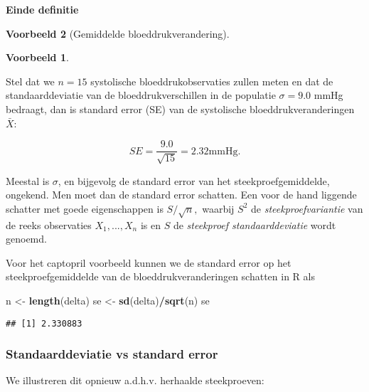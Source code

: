 \documentclass[
  12pt,dutch,coursenotes]{book}
\newenvironment{Shaded}{\begin{snugshade}}{\end{snugshade}}
\newcommand{\KeywordTok}[1]{\textcolor[rgb]{0.13,0.29,0.53}{\textbf{#1}}}
\newcommand{\NormalTok}[1]{#1}
\newcommand{\OperatorTok}[1]{\textcolor[rgb]{0.81,0.36,0.00}{\textbf{#1}}}
\newcommand{\StringTok}[1]{\textcolor[rgb]{0.31,0.60,0.02}{#1}}
\theoremstyle{definition}
\theoremstyle{definition}
\newtheorem{example}{Voorbeeld}[chapter]
\theoremstyle{definition}
\theoremstyle{remark}
\begin{document}
\textbf{Einde definitie}

\begin{example}[Gemiddelde bloeddrukverandering]
\begin{example}

\protect\hypertarget{exm:unnamed-chunk-131}{}{\label{exm:unnamed-chunk-131} \iffalse (Gemiddelde bloeddrukverandering) \fi{} }

\end{example}
\end{example}

Stel dat we \(n = 15\) systolische bloeddrukobservaties zullen meten en dat de standaarddeviatie van de bloeddrukverschillen in de populatie \(\sigma = 9.0\) mmHg bedraagt, dan is standard error (SE) van de systolische bloeddrukveranderingen \(\bar X\):

\[
SE= \frac{9.0}{\sqrt{15}}=2.32\text{mmHg.}
\]

Meestal is \(\sigma\), en bijgevolg de standard error van het
steekproefgemiddelde, ongekend. Men moet dan de standard error schatten.
Een voor de hand liggende schatter met goede eigenschappen is \(S/\sqrt{n},\)
waarbij \(S^2\) de \emph{steekproefvariantie} van de reeks observaties \(X_1,...,X_n\) is en \(S\) de \emph{steekproef standaarddeviatie} wordt genoemd.

Voor het captopril voorbeeld kunnen we de standard error op het steekproefgemiddelde van de bloeddrukveranderingen schatten in R als

\begin{Shaded}
\begin{Highlighting}[]
\NormalTok{n \textless{}{-}}\StringTok{ }\KeywordTok{length}\NormalTok{(delta)}
\NormalTok{se \textless{}{-}}\StringTok{ }\KeywordTok{sd}\NormalTok{(delta)}\OperatorTok{/}\KeywordTok{sqrt}\NormalTok{(n)}
\NormalTok{se}
\end{Highlighting}
\end{Shaded}

\begin{verbatim}
## [1] 2.330883
\end{verbatim}

\hypertarget{standaarddeviatie-vs-standard-error}{%
\subsubsection{Standaarddeviatie vs standard error}\label{standaarddeviatie-vs-standard-error}}

We illustreren dit opnieuw a.d.h.v. herhaalde steekproeven:
\end{document}
